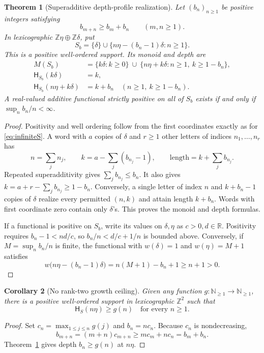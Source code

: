 \documentclass[11pt,a4paper]{article}
\newtheorem{theorem}{Theorem}[section]
\newtheorem{corollary}[theorem]{Corollary}
\theoremstyle{definition}
\theoremstyle{remark}
\newcommand{\N}{\mathbb N}
\newcommand{\Z}{\mathbb Z}
\newcommand{\R}{\mathbb R}
\newcommand{\depth}{\mathsf H}
\begin{document}
\begin{theorem}[Superadditive depth-profile realization]
\label{thm:profiles}
Let $(b_n)_{n\ge1}$ be positive integers satisfying
\[
 b_{m+n}\ge b_m+b_n\qquad(m,n\ge1).
\]
In lexicographic $\Z\eta\oplus\Z\delta$, put
\[
 S_b=\{\delta\}\cup\{n\eta-(b_n-1)\delta:n\ge1\}.
\]
This is a positive well-ordered support. Its monoid and depth are
\begin{align*}
 M(S_b)&=\{k\delta:k\ge0\}\ \cup\
 \{n\eta+k\delta:n\ge1,\ k\ge1-b_n\},\\
 \depth_{S_b}(k\delta)&=k,\\
 \depth_{S_b}(n\eta+k\delta)&=k+b_n
       \quad(n\ge1,\ k\ge1-b_n).
\end{align*}
A real-valued additive functional strictly positive on all of $S_b$ exists
if and only if $\sup_n b_n/n<\infty$.
\end{theorem}
\begin{proof}
Positivity and well ordering follow from the first coordinates exactly as
for \eqref{eq:infiniteS}. A word with $a$ copies of $\delta$ and $r\ge1$
other letters of indices $n_1,\ldots,n_r$ has
\[
 n=\sum_jn_j,\qquad k=a-\sum_j(b_{n_j}-1),\qquad
 \text{length}=k+\sum_j b_{n_j}.
\]
Repeated superadditivity gives $\sum_j b_{n_j}\le b_n$.
It also gives $k=a+r-\sum_j b_{n_j}\ge1-b_n$.
Conversely, a single letter of index $n$ and $k+b_n-1$ copies of
$\delta$ realize every permitted $(n,k)$ and attain length $k+b_n$.
Words with first coordinate zero contain only $\delta$'s.
This proves the monoid and depth formulas.

If a functional is positive on $S_b$, write its values on $\delta,\eta$
as $c>0,d\in\R$. Positivity requires
$b_n-1<nd/c$, so $b_n/n<d/c+1/n$ is bounded above.
Conversely, if $M=\sup_n b_n/n$ is finite, the functional with
$w(\delta)=1$ and $w(\eta)=M+1$ satisfies
\[
 w\bigl(n\eta-(b_n-1)\delta\bigr)=n(M+1)-b_n+1\ge n+1>0.
\]
\end{proof}

\begin{corollary}[No rank-two growth ceiling]\label{cor:arbitrarygrowth}
Given any function $g:\N_{\ge1}\to\N_{\ge1}$, there is a positive
well-ordered support in lexicographic $\Z^2$ such that
\[
 \depth_S(n\eta)\ge g(n)\quad\text{for every }n\ge1.
\]
\end{corollary}
\begin{proof}
Set $c_n=\max_{1\le j\le n}g(j)$ and $b_n=nc_n$.
Because $c_n$ is nondecreasing,
\[
 b_{m+n}=(m+n)c_{m+n}\ge mc_m+nc_n=b_m+b_n.
\]
Theorem~\ref{thm:profiles} gives depth $b_n\ge g(n)$ at $n\eta$.
\end{proof}
\end{document}
